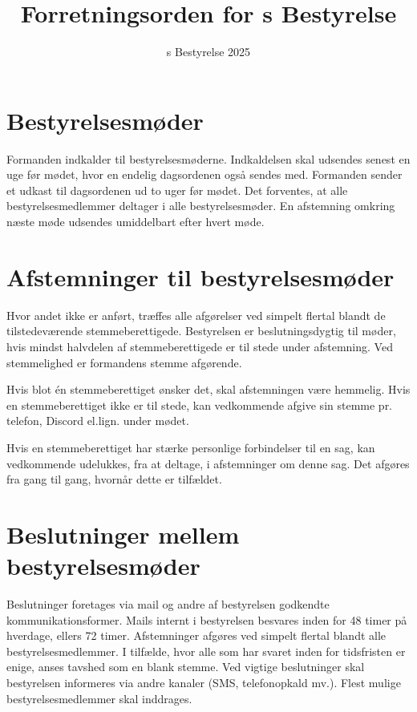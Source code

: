 

\title{Forretningsorden for \fredagscafeen s Bestyrelse}
\author{\fredagscafeen s Bestyrelse 2025}
\date{}

\renewcommand{\thesection}{§\arabic{section}}



\maketitle

\section{Bestyrelsesmøder}
Formanden indkalder til bestyrelsesmøderne. Indkaldelsen skal udsendes senest en uge før mødet, 
hvor en endelig dagsordenen også sendes med. Formanden sender et udkast til dagsordenen ud to 
uger før mødet. Det forventes, at alle bestyrelsesmedlemmer deltager i alle bestyrelsesmøder. 
En afstemning omkring næste møde udsendes umiddelbart efter hvert møde.

\section{Afstemninger til bestyrelsesmøder}
Hvor andet ikke er anført, træffes alle afgørelser ved simpelt flertal blandt de tilstedeværende 
stemmeberettigede. Bestyrelsen er beslutningsdygtig til møder, hvis mindst halvdelen af 
stemmeberettigede er til stede under afstemning. Ved stemmelighed er formandens stemme afgørende.

Hvis blot én stemmeberettiget ønsker det, skal afstemningen være hemmelig. Hvis en stemmeberettiget 
ikke er til stede, kan vedkommende afgive sin stemme pr. telefon, Discord el.lign. under mødet.

Hvis en stemmeberettiget har stærke personlige forbindelser til en sag, kan vedkommende udelukkes, 
fra at deltage, i afstemninger om denne sag. Det afgøres fra gang til gang, hvornår dette er tilfældet.

\section{Beslutninger mellem bestyrelsesmøder}
Beslutninger foretages via mail og andre af bestyrelsen godkendte kommunikationsformer. Mails internt 
i bestyrelsen besvares inden for 48 timer på hverdage, ellers 72 timer. Afstemninger afgøres ved simpelt 
flertal blandt alle bestyrelsesmedlemmer. I tilfælde, hvor alle som har svaret inden for tidsfristen er 
enige, anses tavshed som en blank stemme. Ved vigtige beslutninger skal bestyrelsen informeres via andre 
kanaler (SMS, telefonopkald mv.). Flest mulige bestyrelsesmedlemmer skal inddrages.

